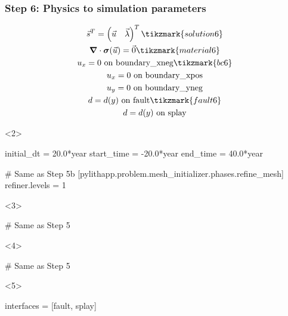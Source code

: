 \documentclass[aspectratio=169]{beamer}
\begin{document}
\begin{frame}[t,fragile]
  \frametitle{Step 6: Physics to simulation parameters}
  \summary{}

  \begin{minipage}[t]{0.3\textwidth}
    {\scriptsize
    \begin{gather*}
    \vec{s}^T = \left( \vec{u} \quad \vec{\lambda} \right)^T \tikzmark{solution6}\\
    \tensor{\nabla} \cdot \tensor{\sigma}(\vec{u}) = \vec{0} \tikzmark{material6}\\
    u_x = 0 \text{ on boundary\_xneg} \tikzmark{bc6}\\
    u_x = 0 \text{ on boundary\_xpos} \\
    u_y = 0 \text{ on boundary\_yneg} \\
    d = d(y) \text{ on fault} \tikzmark{fault6} \\
    d = d(y) \text{ on splay}
    \end{gather*}}
  \end{minipage}
  \hfill
  \begin{minipage}[t]{0.67\textwidth}
    \begin{onlyenv}<2>
      \begin{cfgcode}
        initial_dt = 20.0*year
        start_time = -20.0*year
        end_time = 40.0*year

        # Same as Step 5b
        [pylithapp.problem.mesh_initializer.phases.refine_mesh]
        refiner.levels = 1
      \end{cfgcode}
    \end{onlyenv}
    \begin{onlyenv}<3>
      \begin{cfgcode}
        # Same as Step 5
      \end{cfgcode}
    \end{onlyenv}
    \begin{onlyenv}<4>
      \begin{cfgcode}
        # Same as Step 5
      \end{cfgcode}
    \end{onlyenv}
    \begin{onlyenv}<5>
      \begin{cfgcode}
        interfaces = [fault, splay]


\end{cfgcode}
\end{onlyenv}
\end{minipage}
\end{frame}
\end{document}
